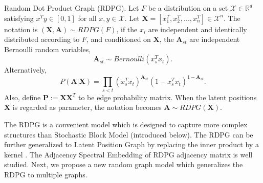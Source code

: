 \documentclass[10pt,journal,compsoc]{IEEEtran}
\newenvironment{definition}[1][Definition]{\begin{trivlist}
		\item[\hskip \labelsep {\bfseries #1}]}{\end{trivlist}}
\newcommand{\bA}{\mathbf{A}}
\newcommand{\bX}{\mathbf{X}}
\newcommand{\bP}{\mathbf{P}}
\begin{document}
\begin{definition} Random Dot Product Graph (RDPG). Let $F$ be a distribution on a set $\mathcal{X} \in \mathbb{R}^d$ satisfying $x^T y \in [0, 1]$ for all $x, y \in \mathcal{X}$. Let $\bX=[x_1^T,x_2^T,...,x_n^T] \in \mathcal{X}^n$. The notation is $(\bX,\bA) \sim RDPG(F)$, if the $x_i$ are independent and identically distributed according to $F$, and conditioned on $\bX$, the $\bA_{st}$ are independent Bernoulli random variables,
	\[ \bA_{st} \sim Bernoulli(x_s^T x_t). \]
	Alternatively,
	\[ P(\bA|\bX) = \prod_{s<t} (x_s^T x_t) ^{ \bA_{st}} (1-x_s^T x_t)^{1- \bA_{st}}.\]
	Also, define $\bP:=\bX\bX^T$ to be edge probability matrix. When the latent positions $\bX$ is regarded as parameter, the notation becomes $\bA \sim RDPG(\bX)$.
\end{definition}
The RDPG is a convenient model which is designed to capture more complex structures than Stochastic Block Model (introduced below). The RDPG can be further generalized to Latent Position Graph by replacing the inner product by a kernel \cite{tang2013universally}. The Adjacency Spectral Embedding of RDPG adjacency matrix is well studied\cite{sussman2014consistent}. Next, we propose a new random graph model which generalizes the RDPG to multiple graphs.
\end{document}
